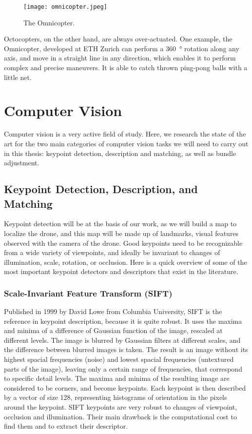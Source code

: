 \begin{figure}[H]
\centering
\texttt{[image: omnicopter.jpeg]}
\caption{The Omnicopter.}
\label{fig:omnicopter}
\end{figure}

Octocopters, on the other hand, are always over-actuated. One example, the Omnicopter, developed at ETH Zurich \cite{omnidirectionalav} can perform a \SI{360}{\degree} rotation along any axis, and move in a straight line in any direction, which enables it to perform complex and precise maneuvers. It is able to catch thrown ping-pong balls with a little net.



\section{Computer Vision}
Computer vision is a very active field of study. Here, we research the state of the art for the two main categories of computer vision tasks we will need to carry out in this thesis: keypoint detection, description and matching, as well as bundle adjustment.

\subsection{Keypoint Detection, Description, and Matching} \label{sec:sota_keypoints}
Keypoint detection will be at the basis of our work, as we will build a map to localize the drone, and this map will be made up of landmarks, visual features observed with the camera of the drone. Good keypoints need to be recognizable from a wide variety of viewpoints, and ideally be invariant to changes of illumination, scale, rotation, or occlusion. Here is a quick overview of some of the most important keypoint detectors and descriptors that exist in the literature.

\subsubsection{Scale-Invariant Feature Transform (SIFT)}
 Published in 1999 by David Lowe from Columbia University, SIFT \cite{sift} is the reference in keypoint description, because it is quite robust. It uses the maxima and minima of a difference of Gaussian function of the image, rescaled at different levels. The image is blurred by Gaussian filters at different scales, and the difference between blurred images is taken. The result is an image without its highest spacial frequencies (noise) and lowest spacial frequencies (untextured parts of the image), leaving only a certain range of frequencies, that correspond to specific detail levels. The maxima and minima of the resulting image are considered to be corners, and become keypoints. Each keypoint is then described by a vector of size \num{128}, representing histograms of orientation in the pixels around the keypoint. SIFT keypoints are very robust to changes of viewpoint, occlusion and illumination. Their main drawback is the computational cost to find them and to extract their descriptor.

